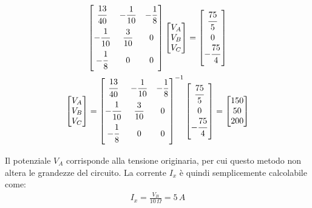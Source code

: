 \documentclass{article}
\numberwithin{equation}{subsection}
\begin{document}
\begin{gather*}
    \begin{bmatrix}
        \displaystyle\frac{\strut 13}{\strut 40}&-\displaystyle\frac{1}{10}&-\displaystyle\frac{1}{8}\\
        -\displaystyle\frac{\strut 1}{\strut 10}&\displaystyle\frac{3}{10}&0\\
        -\displaystyle\frac{\strut 1}{\strut 8}&0&0
    \end{bmatrix}\begin{bmatrix}
        V_A\\V_B\\V_C
    \end{bmatrix}=\begin{bmatrix}
        \displaystyle\frac{\strut 75}{\strut 5}\\0\\-\displaystyle\frac{\strut 75}{\strut 4}
    \end{bmatrix}\\
    \begin{bmatrix}
        V_A\\V_B\\V_C
    \end{bmatrix}=\begin{bmatrix}
        \displaystyle\frac{\strut 13}{\strut 40}&-\displaystyle\frac{1}{10}&-\displaystyle\frac{1}{8}\\
        -\displaystyle\frac{\strut 1}{\strut 10}&\displaystyle\frac{3}{10}&0\\
        -\displaystyle\frac{\strut 1}{\strut 8}&0&0
    \end{bmatrix}^{-1}\begin{bmatrix}
        \displaystyle\frac{\strut 75}{\strut 5}\\0\\-\displaystyle\frac{\strut 75}{\strut 4}
    \end{bmatrix}=\begin{bmatrix}
        150\\50\\200
    \end{bmatrix}
\end{gather*}

Il potenziale $V_A$ corrisponde alla tensione originaria, per cui questo metodo non altera le grandezze del circuito. La corrente $I_x$ è quindi semplicemente calcolabile come:
\begin{gather*}
    I_x=\displaystyle\frac{V_B}{10\,\Omega}=5\,A
\end{gather*}
\end{document}
